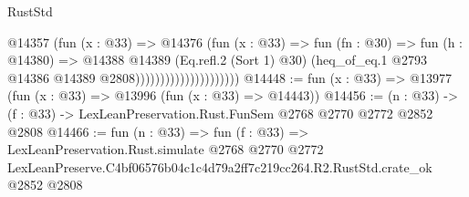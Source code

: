 \begin{lexlean}{RustStd}
\begin{coremodule}
                                      @14357
                                        (fun (x : @33) =>
                                        @14376
                                          (fun (x : @33) =>
                                          fun (fn : @30) =>
                                          fun (h : @14380) =>
                                          @14388
                                            @14389
                                            (Eq.refl.{2} (Sort 1) @30)
                                            (heq_of_eq.{1}
                                              @2793
                                              @14386
                                              @14389
                                              @2808)))))))))))))))))))))
@14448 := fun (x : @33) => @13977 (fun (x : @33) => @13996 (fun (x : @33) => @14443))
@14456 := (n : @33) -> (f : @33) -> LexLeanPreservation.Rust.FunSem @2768 @2770 @2772 @2852 @2808
@14466 := fun (n : @33) =>
  fun (f : @33) =>
  LexLeanPreservation.Rust.simulate
    @2768
    @2770
    @2772
    LexLeanPreserve.C4bf06576b04c1c4d79a2ff7c219cc264.R2.RustStd.crate_ok
    @2852
    @2808
\end{coremodule}
\end{lexlean}
